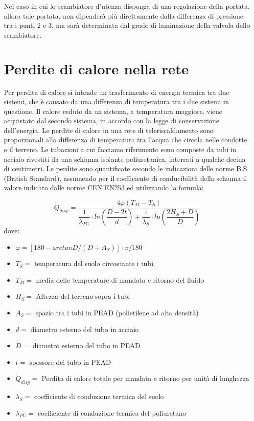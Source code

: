 \documentclass[laurea,oneside,11pt]{USiena_tesiLM}
\begin{document}
Nel caso in cui lo scambiatore d'utenza disponga di una regolazione della portata, allora tale portata, non dipenderà più direttamente dalla differenza di pressione tra i punti 2 e 3, ma sarà determinata dal grado di laminazione della valvola dello scambiatore. 

\section{Perdite di calore nella rete}
Per perdita di calore si intende un trasferimento di 
energia termica tra due sistemi, che è causato da una differenza di temperatura tra i due sistemi in questione. Il calore ceduto da un sistema, a temperatura maggiore, viene acquistato dal secondo sistema, in accordo con la legge di conservazione dell'energia. 
Le perdite di calore in una rete di teleriscaldamento sono proporzionali alla differenza di temperatura tra l'acqua che circola nelle condotte e il terreno. Le tubazioni a cui facciamo riferimento sono composte da tubi in acciaio rivestiti da una schiuma isolante poliuretanica, interrati a qualche decina di centimetri.
Le perdite sono quantificate secondo le indicazioni delle norme B.S. (British Standard), assumendo per il coefficiente di conducibilità della schiuma il valore indicato dalle norme CEN EN253 ed utilizzando la formula:

\begin{equation}
\dot{Q}_{disp} = \dfrac{4 \varphi (T_M - T_S)}{\dfrac{1}{\lambda_{PU}} \cdot ln \left(  \dfrac{D - 2t}{d}\right)  + \dfrac{1}{\lambda_S} \cdot ln \left(  \dfrac{2H_S + D}{D}\right) }
\end{equation}
dove:
\begin{itemize}
\item[] $\varphi = \left[ 180 - arctan  D /( D + A_S)  \right] \cdot \pi/180 $  
\item[] $T_S =$ temperatura del suolo circostante i tubi
\item[] $T_M =$ media delle temperature di mandata e ritorno del fluido
\item[] $H_S =$ Altezza del terreno sopra i tubi
\item[] $A_S =$ spazio tra i tubi in PEAD (polietilene ad alta densità)
\item[] $d =$ diametro esterno del tubo in acciaio
\item[] $D =$ diametro esterno del tubo in PEAD
\item[] $t =$ spessore del tubo in PEAD
\item[] $\dot{Q}_{disp} =$ Perdita di calore totale per mandata e ritorno per unità di lunghezza
\item[] $\lambda_S =$ coefficiente di conduzione termica del suolo
\item[] $\lambda_{PU} =$ coefficiente di conduzione termica del poliuretano
\end{itemize}
\end{document}
